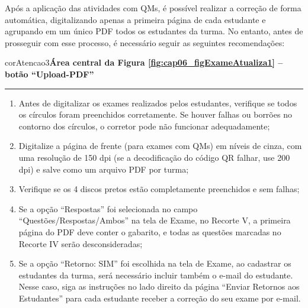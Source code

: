 Após a aplicação das atividades com QMs, é possível realizar a correção de forma automática, digitalizando apenas a primeira página de cada estudante e agrupando em um único PDF todos os estudantes da turma. No entanto, antes de prosseguir com esse processo, é necessário seguir as seguintes recomendações:

\begin{mybox}{corAtencao3}{\textbf{Área central da Figura \ref{fig:cap06_figExameAtualiza1} -- botão ``Upload-PDF''}}\\\vspace{-3mm}\hrule\vspace{1mm}
\begin{enumerate}[itemsep=-1mm]
    \item Antes de digitalizar os exames realizados pelos estudantes, verifique se todos os círculos foram preenchidos corretamente. Se houver falhas ou borrões no contorno dos círculos, o corretor pode não funcionar adequadamente;
    \item Digitalize a página de frente (para exames com QMs) em níveis de cinza, com uma resolução de 150 dpi (se a decodificação do código QR falhar, use 200 dpi) e salve como um arquivo PDF por turma;
    \item Verifique se os 4 discos pretos estão completamente preenchidos e sem falhas;
    \item Se a opção ``Respostas'' foi selecionada no campo ``Questões/Respostas/Ambos'' na tela de Exame, no Recorte V, a primeira página do PDF deve conter o gabarito, e todas as questões marcadas no Recorte IV serão desconsideradas;
    \item Se a opção ``Retorno: SIM'' foi escolhida na tela de Exame, ao cadastrar os estudantes da turma, será necessário incluir também o e-mail do estudante. Nesse caso, siga as instruções no lado direito da página ``Enviar Retornos aos Estudantes'' para cada estudante receber a correção do seu exame por e-mail.
\end{enumerate}
\end{mybox}


